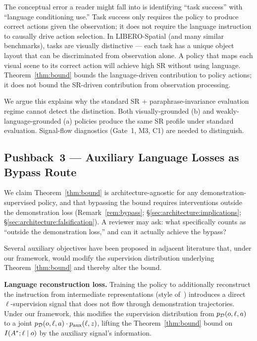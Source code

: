 The conceptual error a reader might fall into is identifying ``task success'' with
``language conditioning use.'' Task success only requires the policy to produce correct
actions given the observation; it does not require the language instruction to causally
drive action selection. In LIBERO-Spatial (and many similar benchmarks), tasks are
visually distinctive --- each task has a unique object layout that can be discriminated
from observation alone. A policy that maps each visual scene to its correct action will
achieve high SR without using language. Theorem~\ref{thm:bound} bounds the
language-driven contribution to policy actions; it does not bound the SR-driven
contribution from observation processing.

We argue this explains why the standard SR + paraphrase-invariance evaluation regime
cannot detect the distinction. Both visually-grounded (b) and weakly-language-grounded
(a) policies produce the same SR profile under standard evaluation. Signal-flow
diagnostics (Gate~1, M3, C1) are needed to distinguish.

\subsection{Pushback~3 --- Auxiliary Language Losses as Bypass Route}
\label{sec:discussion:pushback_auxiliary}

We claim Theorem~\ref{thm:bound} is architecture-agnostic for any demonstration-supervised
policy, and that bypassing the bound requires interventions outside the demonstration
loss (Remark~\ref{rem:bypass}; \S\ref{sec:architecture:implications};
\S\ref{sec:architecture:falsification}). A reviewer may ask: what specifically counts as
``outside the demonstration loss,'' and can it actually achieve the bypass?

Several auxiliary objectives have been proposed in adjacent literature that, under our
framework, would modify the supervision distribution underlying
Theorem~\ref{thm:bound} and thereby alter the bound.

\textbf{Language reconstruction loss.} Training the policy to additionally reconstruct
the instruction from intermediate representations (style of~\cite{lynch2020multitask})
introduces a direct $\ell$-supervision signal that does not flow through demonstration
trajectories. Under our framework, this modifies the supervision distribution from
$p_{\mathcal{D}}(o, \ell, a)$ to a joint $p_{\mathcal{D}}(o, \ell, a) \cdot p_{\text{aux}}(\ell, z)$,
lifting the Theorem~\ref{thm:bound} bound on $I(A^{*}; \ell \mid o)$ by the auxiliary
signal's information.

